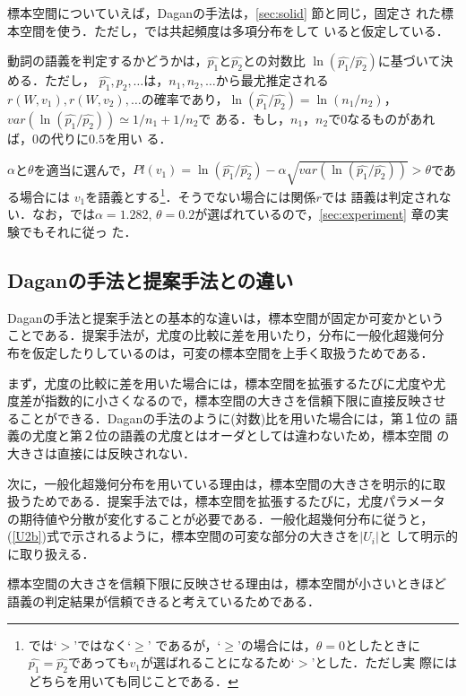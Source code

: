 標本空間についていえば，Daganの手法は，\ref{sec:solid} 節と同じ，固定さ
れた標本空間を使う．ただし，\cite{Dagan94}では共起頻度は多項分布をして
いると仮定している．

動詞の語義を判定するかどうかは，$\hat{p_1}$と$\hat{p_2}$との対数比
$\ln(\hat{p_1}/\hat{p_2})$に基づいて決める．ただし，
$\hat{p_1},\hat{p_2},\ldots$は，$n_1,n_2,\ldots$から最尤推定される
$r(W,v_1),r(W,v_2),\ldots$の確率であり，$\ln(\hat{p_1}/\hat{p_2}) =
\ln(n_1/n_2)$，$var(\ln(\hat{p_1}/\hat{p_2})) \simeq 1/n_1 + 1/n_2$で
ある．もし，$n_1$，$n_2$で$0$なるものがあれば，$0$の代りに$0.5$を用い
る．

$\alpha$と$\theta$を適当に選んで，$Pl(v_1) = \ln(\hat{p_1}/\hat{p_2}) -
\alpha \sqrt{var(\ln(\hat{p_1}/\hat{p_2}))} > \theta$である場合には
$v_1$を語義とする\footnote{\cite{Dagan94}では`$>$'ではなく`$ \ge$'
であるが，`$ \ge$'の場合には，$\theta = 0$としたときに $\hat{p_1} =
\hat{p_2}$であっても$v_1$が選ばれることになるため`$>$'とした．ただし実
際にはどちらを用いても同じことである．}．そうでない場合には関係$r$では
語義は判定されない．なお，\cite{Dagan94}では$\alpha = 1.282$, $\theta
= 0.2$が選ばれているので，\ref{sec:experiment} 章の実験でもそれに従っ
た．

\subsection{Daganの手法と提案手法との違い}

Daganの手法と提案手法との基本的な違いは，標本空間が固定か可変かという
ことである．提案手法が，尤度の比較に差を用いたり，分布に一般化超幾何分
布を仮定したりしているのは，可変の標本空間を上手く取扱うためである．

まず，尤度の比較に差を用いた場合には，標本空間を拡張するたびに尤度や尤
度差が指数的に小さくなるので，標本空間の大きさを信頼下限に直接反映させ
ることができる．Daganの手法のように(対数)比を用いた場合には，第１位の
語義の尤度と第２位の語義の尤度とはオーダとしては違わないため，標本空間
の大きさは直接には反映されない．

次に，一般化超幾何分布を用いている理由は，標本空間の大きさを明示的に取
扱うためである．提案手法では，標本空間を拡張するたびに，尤度パラメータ
の期待値や分散が変化することが必要である．一般化超幾何分布に従うと，
(\ref{U2b})式で示されるように，標本空間の可変な部分の大きさを$|U_i|$と
して明示的に取り扱える．

標本空間の大きさを信頼下限に反映させる理由は，標本空間が小さいときほど
語義の判定結果が信頼できると考えているためである．

